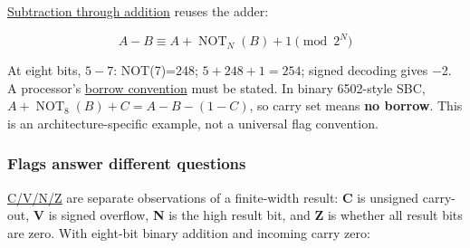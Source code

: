 \hyperref[appendix-1c7df340573e]{Subtraction through addition} reuses the adder:

\[
A-B \equiv A+\operatorname{NOT}_N(B)+1\pmod{2^N}
\]

At eight bits, \(5-7\): NOT(7)=248; \(5+248+1=254\); signed decoding gives −2. A processor's \hyperref[appendix-d52d5f78ffd1]{borrow convention} must be stated. In binary 6502-style SBC, \(A+\operatorname{NOT}_8(B)+C=A-B-(1-C)\), so carry set means \textbf{no borrow}. This is an architecture-specific example, not a universal flag convention.

\subsubsection{Flags answer different questions}\label{05-engine-i-ch001-flags-answer-different-questions}

\hyperref[appendix-8d687c9c08ab]{C/V/N/Z} are separate observations of a finite-width result: \textbf{C} is unsigned carry-out, \textbf{V} is signed overflow, \textbf{N} is the high result bit, and \textbf{Z} is whether all result bits are zero. With eight-bit binary addition and incoming carry zero:

